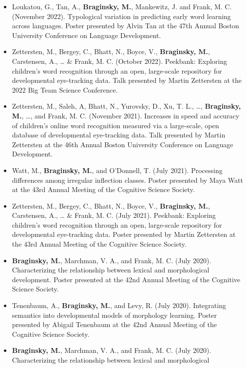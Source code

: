 \documentclass[11pt,]{article}
\begin{document}
\begin{itemize}
\item
  Loukatou, G., Tan, A., \textbf{Braginsky, M.}, Mankewitz, J. and
  Frank, M. C. (November 2022). Typological variation in predicting
  early word learning across languages. Poster presented by Alvin Tan at
  the 47th Annual Boston University Conference on Language Development.
\item
  Zettersten, M., Bergey, C., Bhatt, N., Boyce, V., \textbf{Braginsky,
  M.}, Carstensen, A., \ldots{} \& Frank, M. C. (October 2022).
  Peekbank: Exploring children's word recognition through an open,
  large-scale repository for developmental eye-tracking data. Talk
  presented by Martin Zettersten at the 2022 Big Team Science
  Conference.
\item
  Zettersten, M., Saleh, A, Bhatt, N., Yurovsky, D., Xu, T. L., \ldots,
  \textbf{Braginsky, M.}, \ldots, and Frank, M. C. (November 2021).
  Increases in speed and accuracy of children's online word recognition
  measured via a large-scale, open database of developmental
  eye-tracking data. Talk presented by Martin Zettersten at the 46th
  Annual Boston University Conference on Language Development.
\item
  Watt, M., \textbf{Braginsky, M.}, and O'Donnell, T. (July 2021).
  Processing differences among irregular inflection classes. Poster
  presented by Maya Watt at the 43rd Annual Meeting of the Cognitive
  Science Society.
\item
  Zettersten, M., Bergey, C., Bhatt, N., Boyce, V., \textbf{Braginsky,
  M.}, Carstensen, A., \ldots{} \& Frank, M. C. (July 2021). Peekbank:
  Exploring children's word recognition through an open, large-scale
  repository for developmental eye-tracking data. Poster presented by
  Martin Zettersten at the 43rd Annual Meeting of the Cognitive Science
  Society.
\item
  \textbf{Braginsky, M.}, Marchman, V. A., and Frank, M. C. (July 2020).
  Characterizing the relationship between lexical and morphological
  development. Poster presented at the 42nd Annual Meeting of the
  Cognitive Science Society.
\item
  Tenenbaum, A., \textbf{Braginsky, M.}, and Levy, R. (July 2020).
  Integrating semantics into developmental models of morphology
  learning. Poster presented by Abigail Tenenbaum at the 42nd Annual
  Meeting of the Cognitive Science Society.
\item
  \textbf{Braginsky, M.}, Marchman, V. A., and Frank, M. C. (July 2020).
  Characterizing the relationship between lexical and morphological

\end{itemize}
\end{document}
